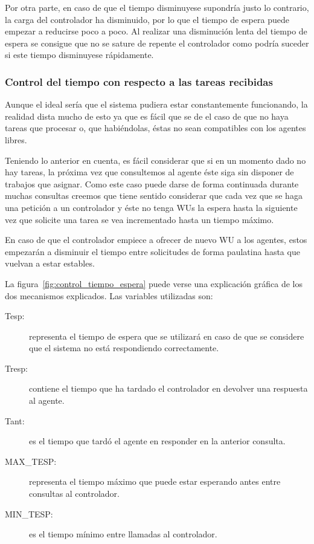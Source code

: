 Por otra parte, en caso de que el tiempo disminuyese supondría justo lo contrario, la carga del controlador ha disminuido, por lo que el tiempo de espera puede empezar a reducirse poco a poco. Al realizar una disminución lenta del tiempo de espera se consigue que no se sature de repente el controlador como podría suceder si este tiempo disminuyese rápidamente.

\subsubsection{Control del tiempo con respecto a las tareas recibidas}

Aunque el ideal sería que el sistema pudiera estar constantemente funcionando, la realidad dista mucho de esto ya que es fácil que se de el caso de que no haya tareas que procesar o, que habiéndolas, éstas no sean compatibles con los agentes libres.

Teniendo lo anterior en cuenta, es fácil considerar que si en un momento dado no hay tareas, la próxima vez que consultemos al agente éste siga sin disponer de trabajos que asignar. Como este caso puede darse de forma continuada durante muchas consultas creemos que tiene sentido considerar que cada vez que se haga una petición a un controlador y éste no tenga WUs la espera hasta la siguiente vez que solicite una tarea se vea incrementado hasta un tiempo máximo. 

En caso de que el controlador empiece a ofrecer de nuevo WU a los agentes, estos empezarán a disminuir el tiempo entre solicitudes de forma paulatina hasta que vuelvan a estar estables.

La figura~\ref{fig:control_tiempo_espera} puede verse una explicación gráfica de los dos mecanismos explicados. Las variables utilizadas son:
\begin{description}
	\item[Tesp:] representa el tiempo de espera que se utilizará en caso de que se considere que el sistema no está respondiendo correctamente.
	
	\item[Tresp:] contiene el tiempo que ha tardado el controlador en devolver una respuesta al agente.
	
	\item[Tant:] es el tiempo que tardó el agente en responder en la anterior consulta.
	
	\item[MAX\_TESP:] representa el tiempo máximo que puede estar esperando antes entre consultas al controlador.
	
	\item[MIN\_TESP:] es el tiempo mínimo entre llamadas al controlador.
\end{description}

